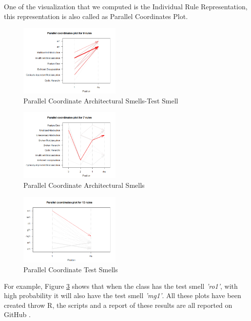 One of the visualization that we computed is the Individual Rule Representation, this representation is also called as Parallel Coordinates Plot.
\begin{figure}[!ht]
    \centering
    \includegraphics[width=5cm]{img/parallelCoordinateArchTest.png}
    \caption{Parallel Coordinate Architectural Smells-Test Smell}
    \label{fig:parallelCoordinateArchTest}
\end{figure}
\begin{figure}[!ht]
    \centering
    \includegraphics[width=5cm]{img/parallelCoordinateArch.png}
    \caption{Parallel Coordinate Architectural Smells}
    \label{fig:parallelCoordinateArch}
\end{figure}
\begin{figure}[!ht]
    \centering
    \includegraphics[width=5cm]{img/parallelCoordinateTest.png}
    \caption{Parallel Coordinate Test Smells}
    \label{fig:parallelCoordinateTest}
\end{figure}

For example, Figure \ref{fig:parallelCoordinateTest} shows that when the class has the test smell \textit{'ro1'}, with high probability it will also have the test smell \textit{'mg1'}.
All these plots have been created throw R, the scripts and a report of these results are all reported on GitHub \cite{IEEEhowto:rNotebook}.\par\hfill\par\hfill\par\hfill\par\hfill
